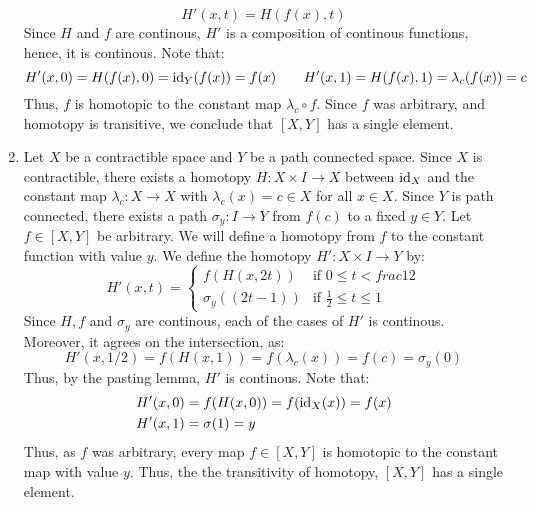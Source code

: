 \documentclass[12pt]{article}
\begin{document}
\begin{solu}
\begin{enumerate}
        \[ H'(x, t) = H(f(x), t)\]
        Since $H$ and $f$ are continous, $H'$ is a composition of continous functions, hence, it is continous. Note that: 
        \[ H'(x, 0) = H(f(x), 0) = \operatorname{id}_Y(f(x)) = f(x) \qquad H'(x, 1) = H(f(x), 1) = \lambda_c(f(x)) = c \]
        Thus, $f$ is homotopic to the constant map $\lambda_c \circ f$. Since $f$ was arbitrary, and homotopy is transitive, we conclude that $[X,Y]$ has a single element. 
        \item Let $X$ be a contractible space and $Y$ be a path connected space. Since $X$ is contractible, there exists a homotopy $H: X \times I \to X$ between $\operatorname{id}_X$ and the constant map $\lambda_c: X \to X$ with $\lambda_c(x) = c \in X$ for all $x \in X$. Since $Y$ is path connected, there exists a path $\sigma_y: I \to Y$ from $f(c)$ to a fixed $y \in Y$. Let $f \in [X,Y]$ be arbitrary. We will define a homotopy from $f$ to the constant function with value $y$. \bbni
        We define the homotopy $H': X \times I \to Y$ by:
        \[ H'(x, t) = \begin{cases}
            f(H(x, 2t)) & \text{if } 0 \leq t < frac{1}{2} \\
            \sigma_y((2t - 1)) & \text{if } \frac{1}{2} \leq t \leq 1
        \end{cases} \]
        Since $H, f$ and $\sigma_y$ are continous, each of the cases of $H'$ is continous. Moreover, it agrees on the intersection, as:
        \[ H'(x, 1/2) = f(H(x, 1)) = f(\lambda_c(x)) = f(c) = \sigma_y(0)  \]
        Thus, by the pasting lemma, $H'$ is continous. \bbni
        Note that:
        \begin{align*}
            H'(x, 0) &= f(H(x, 0)) = f(\operatorname{id}_X(x)) = f(x) \\
            H'(x, 1) &= \sigma(1) = y
        \end{align*}
        Thus, as $f$ was arbitrary, every map $f \in [X, Y]$ is homotopic to the constant map with value $y$. Thus, the the transitivity of homotopy, $[X,Y]$ has a single element. 

    \end{enumerate}
\end{solu}
\end{document}
